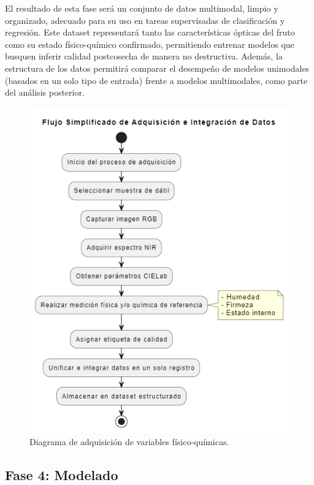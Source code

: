 El resultado de esta fase será un conjunto de datos multimodal, limpio y organizado, adecuado para su uso en tareas supervisadas de clasificación y regresión. Este dataset representará tanto las características ópticas del fruto como su estado físico-químico confirmado, permitiendo entrenar modelos que busquen inferir calidad postcosecha de manera no destructiva. Además, la estructura de los datos permitirá comparar el desempeño de modelos unimodales (basados en un solo tipo de entrada) frente a modelos multimodales, como parte del análisis posterior.

\begin{figure}[th]
\centering
\includegraphics[scale=0.75]{Figures/adquisicion.png}
\decoRule
\caption{Diagrama de adquisición de variables físico-químicas.}
\label{fig:Diagrama_Adquisicion}
\end{figure}

\subsection{Fase 4: Modelado}

